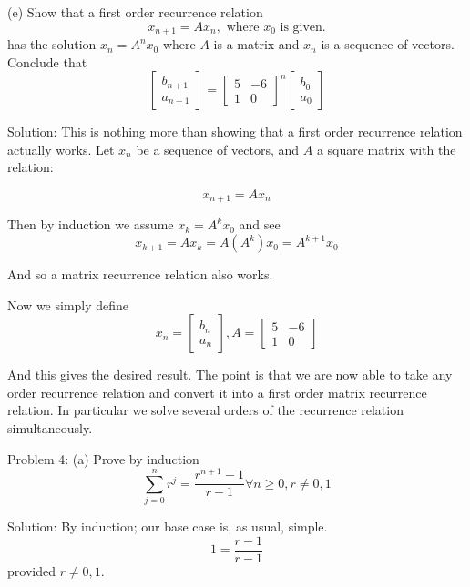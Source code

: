 \documentclass[16 pt]{amsart}
\theoremstyle{definition}
\theoremstyle{remark}
\numberwithin{equation}{subsection}
\begin{document}
\vspace{.5in}

(e) Show that a first order recurrence relation
\[
x_{n+1} = A x_n, \text{ where } x_0 \text{ is given.}
\]
has the solution $x_{n} = A^n x_0$ where $A$ is a matrix and $x_n$ is a sequence of vectors.\\

Conclude that
\[
\begin{bmatrix}
b_{n+1} \\ a_{n+1}
\end{bmatrix} = \begin{bmatrix}
5 & -6 \\ 
1 & 0 
\end{bmatrix}^n \begin{bmatrix}
b_0 \\ a_0
\end{bmatrix}
\]


\vspace{.5in}

Solution: This is nothing more than showing that a first order recurrence relation actually works.  Let $x_n$ be a sequence of vectors, and $A$ a square matrix with the relation:

\[
x_{n+1} = A x_n
\]

Then by induction we assume $x_k = A^k x_0$ and see
\[
x_{k+1} = A x_k = A(A^k)x_0 = A^{k+1}x_0
\]

And so a matrix recurrence relation also works.

Now we simply define
\[
x_n = \begin{bmatrix}
b_n \\ a_n
\end{bmatrix}, A = \begin{bmatrix}
5 & -6 \\ 1 & 0
\end{bmatrix}
\]

And this gives the desired result.  The point is that we are now able to take any order recurrence relation and convert it into a first order matrix recurrence relation.  In particular we solve several orders of the recurrence relation simultaneously.

\newpage

Problem 4: (a) Prove by induction
\[
\sum_{j=0}^{n} r^j = \frac{r^{n+1}-1}{r-1}  \forall n\ge 0 , r\ne 0,1
\]

\vspace{.5in}

Solution: By induction; our base case is, as usual, simple.
\[
1 = \frac{r-1}{r-1} 
\]
provided $r\ne 0,1$.
\end{document}
